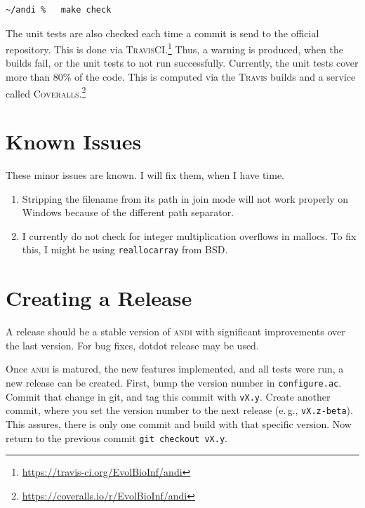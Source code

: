 \documentclass[a4paper,
  10pt,
  english,
  DIV=12,
  BCOR=8mm]{scrbook}
\newcommand{\algo}[1]{\textsc{{#1}}}
\newcommand{\andi}{\algo{andi} }
\begin{document}
\begin{lstlisting}
~/andi %   make check
\end{lstlisting}

\noindent The unit tests are also checked each time a commit is send to the official repository. This is done via \algo{TravisCI}.\footnote{\url{https://travis-ci.org/EvolBioInf/andi}} Thus, a warning is produced, when the builds fail, or the unit tests to not run successfully. Currently, the unit tests cover more than 80\% of the code. This is computed via the \algo{Travis} builds and a service called \algo{Coveralls}.\footnote{\url{https://coveralls.io/r/EvolBioInf/andi}}

\section{Known Issues}

These minor issues are known. I will fix them, when I have time.

\begin{enumerate}
  \item Stripping the filename from its path in join mode will not work properly on Windows because of the different path separator.
  \item I currently do not check for integer multiplication overflows in mallocs. To fix this, I might be using \lstinline$reallocarray$ from BSD.
\end{enumerate}


\section{Creating a Release}

A release should be a stable version of \andi with significant improvements over the last version. For bug fixes, dotdot release may be used.


Once \andi is matured, the new features implemented, and all tests were run, a new release can be created. First, bump the version number in \lstinline$configure.ac$. Commit that change in git, and tag this commit with \lstinline$vX.y$. Create another commit, where you set the version number to the next release (e.\,g., \lstinline$vX.z-beta$). This assures, there is only one commit and build with that specific version. Now return to the previous commit \lstinline$git checkout vX.y$.
\end{document}
